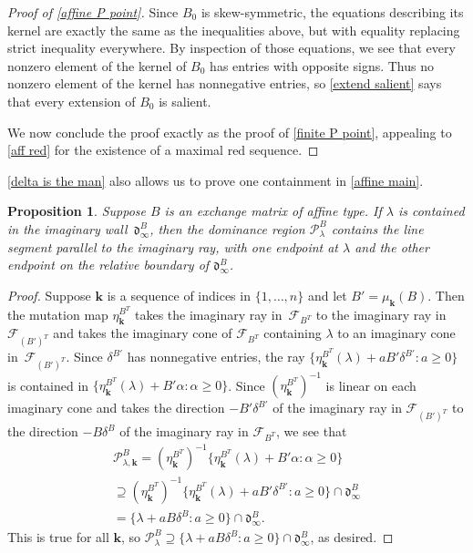 \documentclass{amsart}
\newtheorem{proposition}{Proposition}[section]
\theoremstyle{definition}
\theoremstyle{remark}
\numberwithin{equation}{section}
\newcommand{\set}[1]{{\lbrace #1 \rbrace}}
\newcommand{\F}{{\mathcal F}}
\newcommand{\0}{{\mathbf{0}}}
\newcommand{\kk}{\mathbf{k}}
\renewcommand{\P}{\mathcal{P}}
\renewcommand{\d}{{\mathfrak d}}
\begin{document}
\begin{proof}[Proof of \cref{affine P point}]
Since $B_0$ is skew-symmetric, the equations describing its kernel are exactly the same as the inequalities above, but with equality replacing strict inequality everywhere.
By inspection of those equations, we see that every nonzero element of the kernel of $B_0$ has entries with opposite signs.
Thus no nonzero element of the kernel has nonnegative entries, so \cref{extend salient} says that every extension of $B_0$ is salient.

We now conclude the proof exactly as the proof of \cref{finite P point}, appealing to \cref{aff red} for the existence of a maximal red sequence.
\end{proof}

\cref{delta is the man} also allows us to prove one containment in \cref{affine main}.

\begin{proposition}\label{affine main partial}
Suppose $B$ is an exchange matrix of affine type.
If $\lambda$ is contained in the imaginary wall~$\d^B_\infty$, then the dominance region $\P^B_\lambda$ \emph{contains} the line segment parallel to the imaginary ray, with one endpoint at $\lambda$ and the other endpoint on the relative boundary of $\d^B_\infty$.
\end{proposition}
\begin{proof}
Suppose $\kk$ is a sequence of indices in $\set{1,\ldots,n}$ and let $B'=\mu_\kk(B)$.
Then the mutation map $\eta^{B^T}_\kk$ takes the imaginary ray in~$\F_{B^T}$ to the imaginary ray in~$\F_{(B')^T}$ and takes the imaginary cone of $\F_{B^T}$ containing $\lambda$ to an imaginary cone in~$\F_{(B')^T}$.
Since $\delta^{B'}$ has nonnegative entries, the ray $\set{\eta^{B^T}_\kk(\lambda)+aB'\delta^{B'}:a\ge0}$ is contained in $\set{\eta^{B^T}_\kk(\lambda)+B'\alpha:\alpha\ge0}$.
Since $(\eta_\kk^{B^T})^{-1}$ is linear on each imaginary cone and takes the direction $-B'\delta^{B'}$ of the imaginary ray in $\F_{(B')^T}$ to the direction $-B\delta^B$ of the imaginary ray in $\F_{B^T}$, we see that 
\begin{multline*}
\P^B_{\lambda,\kk}=(\eta_\kk^{B^T})^{-1}\set{\eta^{B^T}_\kk(\lambda)+B'\alpha:\alpha\ge0}\\
\supseteq(\eta_\kk^{B^T})^{-1}\set{\eta^{B^T}_\kk(\lambda)+aB'\delta^{B'}:a\ge0}\cap\d^B_\infty\\
=\set{\lambda+aB\delta^B:a\ge0}\cap\d^B_\infty. 
\end{multline*}
This is true for all $\kk$, so $\P^B_\lambda\supseteq\set{\lambda+aB\delta^B:a\ge0}\cap\d^B_\infty$, as desired.
\end{proof}
\end{document}
